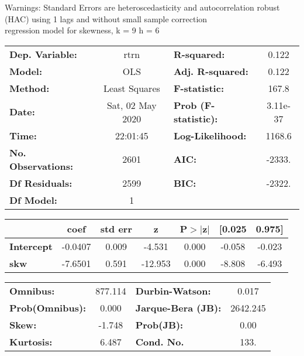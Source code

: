 Warnings: \newline
 [1] Standard Errors are heteroscedasticity and autocorrelation robust (HAC) using 1 lags and without small sample correction\\ 

regression model for skewness, k = 9 h = 6\begin{center}
\begin{tabular}{lclc}
\toprule
\textbf{Dep. Variable:}    &       rtrn       & \textbf{  R-squared:         } &     0.122   \\
\textbf{Model:}            &       OLS        & \textbf{  Adj. R-squared:    } &     0.122   \\
\textbf{Method:}           &  Least Squares   & \textbf{  F-statistic:       } &     167.8   \\
\textbf{Date:}             & Sat, 02 May 2020 & \textbf{  Prob (F-statistic):} &  3.11e-37   \\
\textbf{Time:}             &     22:01:45     & \textbf{  Log-Likelihood:    } &    1168.6   \\
\textbf{No. Observations:} &        2601      & \textbf{  AIC:               } &    -2333.   \\
\textbf{Df Residuals:}     &        2599      & \textbf{  BIC:               } &    -2322.   \\
\textbf{Df Model:}         &           1      & \textbf{                     } &             \\
\bottomrule
\end{tabular}
\begin{tabular}{lcccccc}
                   & \textbf{coef} & \textbf{std err} & \textbf{z} & \textbf{P$> |$z$|$} & \textbf{[0.025} & \textbf{0.975]}  \\
\midrule
\textbf{Intercept} &      -0.0407  &        0.009     &    -4.531  &         0.000        &       -0.058    &       -0.023     \\
\textbf{skw}       &      -7.6501  &        0.591     &   -12.953  &         0.000        &       -8.808    &       -6.493     \\
\bottomrule
\end{tabular}
\begin{tabular}{lclc}
\textbf{Omnibus:}       & 877.114 & \textbf{  Durbin-Watson:     } &    0.017  \\
\textbf{Prob(Omnibus):} &   0.000 & \textbf{  Jarque-Bera (JB):  } & 2642.245  \\
\textbf{Skew:}          &  -1.748 & \textbf{  Prob(JB):          } &     0.00  \\
\textbf{Kurtosis:}      &   6.487 & \textbf{  Cond. No.          } &     133.  \\
\bottomrule
\end{tabular}
\end{center}

